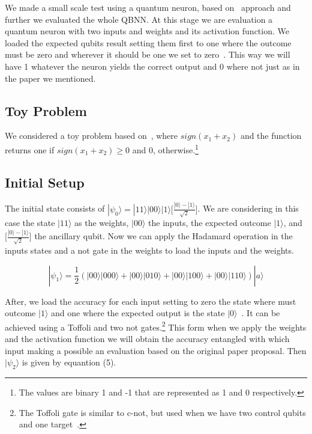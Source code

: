 \documentclass[conference]{IEEEtran}
\begin{document}
 We made a small scale test using a quantum neuron, based on~\cite{fawaz2019training} approach and further we evaluated
 the whole QBNN\@.
 At this stage we are evaluation a quantum neuron with two inputs and weights and its activation function.
 We loaded the expected qubits result setting them first to one where the outcome must be zero and wherever it should
 be one we set to zero~\cite{fawaz2019training}.
 This way we will have 1 whatever the neuron yields the correct output and 0 where not just as in the paper we mentioned.

 \subsection*{Toy Problem}
    We considered a toy problem based on~\cite{fawaz2019training}, where \(sign(x_1 + x_2)\) and the function returns one
    if \(sign(x_1 + x_2) \geq 0\) and 0, otherwise.\footnote{The values are binary 1 and -1 that are represented as 1
    and 0 respectively.}

\subsection{Initial Setup}\label{subsec:initial-setup}


The initial state consists of \(|\psi_0\rangle = |11\rangle|00\rangle|1\rangle\Big[\frac{|0\rangle - |1\rangle}{\sqrt{2}}\Big]\).
We are considering in this case the state \(|11\rangle\) as the weights, \(|00\rangle\) the inputs, the expected outcome \(|1\rangle\), and
\(\Big[\frac{|0\rangle - |1\rangle}{\sqrt{2}}\Big]\) the ancillary qubit.
Now we can apply the Hadamard operation in the inputs states and a not gate in the weights to load the inputs and the weights.

\begin{equation}
|\psi_1\rangle = \frac{1}{2}(|00\rangle|000\rangle + |00\rangle|010\rangle + |00\rangle|100\rangle + |00\rangle|110\rangle)
|a\rangle
\end{equation}

After, we load the accuracy for each input setting to zero the state where must outcome \(|1\rangle\) and one where the
expected output is the state $|0\rangle$~\cite{fawaz2019training}.
It can be achieved using a Toffoli and two not gates.\footnote{The Toffoli gate is similar to c-not, but used when we have
two control qubits and one target~\cite{yanofsky2008quantum}.}
This form when we apply the weights and the activation function we will obtain the accuracy entangled with which input
making a possible an evaluation based on the original paper proposal.
Then \(|\psi_2\rangle\) is given by equantion (5).
\end{document}
